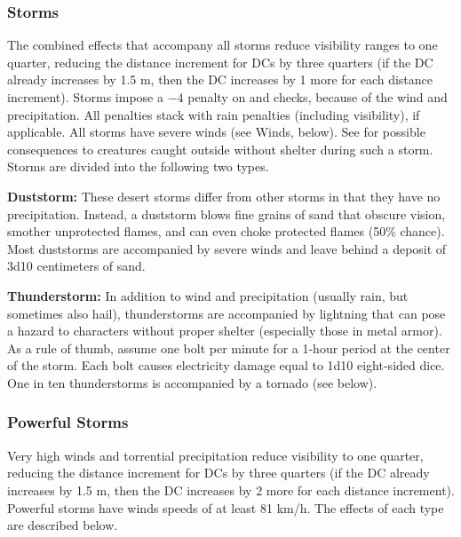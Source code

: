 \subsubsection{Storms}
The combined effects that accompany all storms reduce visibility ranges to one quarter, reducing the distance increment for  DCs by three quarters (if the DC already increases by 1.5 m, then the DC increases by 1 more for each distance increment). Storms impose a $-4$ penalty on  and  checks, because of the wind and precipitation. All penalties stack with rain penalties (including visibility), if applicable. All storms have severe winds (see Winds, below). See  for possible consequences to creatures caught outside without shelter during such a storm. Storms are divided into the following two types.

\textbf{Duststorm:} These desert storms differ from other storms in that they have no precipitation. Instead, a duststorm blows fine grains of sand that obscure vision, smother unprotected flames, and can even choke protected flames (50\% chance). Most duststorms are accompanied by severe winds and leave behind a deposit of 3d10 centimeters of sand.

\textbf{Thunderstorm:} In addition to wind and precipitation (usually rain, but sometimes also hail), thunderstorms are accompanied by lightning that can pose a hazard to characters without proper shelter (especially those in metal armor). As a rule of thumb, assume one bolt per minute for a 1-hour period at the center of the storm. Each bolt causes electricity damage equal to 1d10 eight-sided dice. One in ten thunderstorms is accompanied by a tornado (see below).

\subsubsection{Powerful Storms}
Very high winds and torrential precipitation reduce visibility to one quarter, reducing the distance increment for  DCs by three quarters (if the DC already increases by 1.5 m, then the DC increases by 2 more for each distance increment). Powerful storms have winds speeds of at least 81 km/h. The effects of each type are described below.

